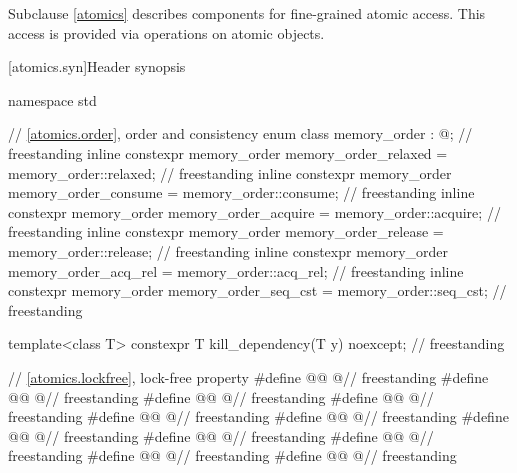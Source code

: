 \pnum
Subclause \ref{atomics} describes components for fine-grained atomic access.
This access is provided via operations on atomic objects.

[atomics.syn]{Header  synopsis}

%
\begin{codeblock}
namespace std {
  // \ref{atomics.order}, order and consistency
  enum class memory_order : @\unspecnc@;                                            // freestanding
  inline constexpr memory_order memory_order_relaxed = memory_order::relaxed;       // freestanding
  inline constexpr memory_order memory_order_consume = memory_order::consume;       // freestanding
  inline constexpr memory_order memory_order_acquire = memory_order::acquire;       // freestanding
  inline constexpr memory_order memory_order_release = memory_order::release;       // freestanding
  inline constexpr memory_order memory_order_acq_rel = memory_order::acq_rel;       // freestanding
  inline constexpr memory_order memory_order_seq_cst = memory_order::seq_cst;       // freestanding

  template<class T>
    constexpr T kill_dependency(T y) noexcept;                                      // freestanding
}

// \ref{atomics.lockfree}, lock-free property
#define @@ @\unspecnc@                                           // freestanding
#define @@ @\unspecnc@                                           // freestanding
#define @@ @\unspecnc@                                        // freestanding
#define @@ @\unspecnc@                                       // freestanding
#define @@ @\unspecnc@                                       // freestanding
#define @@ @\unspecnc@                                        // freestanding
#define @@ @\unspecnc@                                          // freestanding
#define @@ @\unspecnc@                                            // freestanding
#define @@ @\unspecnc@                                           // freestanding
#define @@ @\unspecnc@                                          // freestanding
#define @@ @\unspecnc@                                        // freestanding


\end{codeblock}
